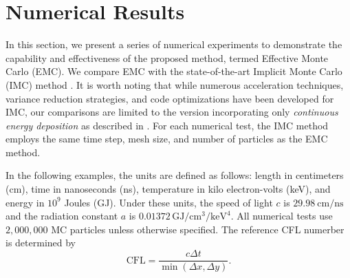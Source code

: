 \documentclass[preprint,12pt]{elsarticle}
\theoremstyle{definition}
\theoremstyle{plain}
\numberwithin{equation}{section}
\numberwithin{algorithm}{section}
\newcounter{eq_count}
\newcounter{subeq_count}
\newcounter{thm_count}
\newcounter{fig_count}
\newcounter{tab_count}
\newcounter{alg_count}
\let\OldSection\section
\renewcommand{\section}{
    \setcounter{eq_count}{0}
    \setcounter{thm_count}{0}
    \setcounter{fig_count}{0}
    \setcounter{tab_count}{0}
    \setcounter{alg_count}{0}
    \OldSection
}
\begin{document}


\section{Numerical Results}
\label{sec:results}
In this section, we present a series of numerical experiments to demonstrate the capability and effectiveness of the proposed method, termed Effective Monte Carlo (EMC). We compare EMC with the state-of-the-art Implicit Monte Carlo (IMC) method \cite{fleck1971implicit}. It is worth noting that while numerous acceleration techniques, variance reduction strategies, and code optimizations have been developed for IMC, our comparisons are limited to the version incorporating only \textit{continuous energy deposition} as described in \cite{fleck1971implicit}. For each numerical test, the IMC method employs the same time step, mesh size, and number of particles as the EMC method.

In the following examples, the units are defined as follows: length in centimeters (cm), time in nanoseconds (ns), temperature in kilo electron-volts (keV), and energy in $10^9$ Joules (GJ). Under these units, the speed of light $c$ is $29.98 \mathrm{~	cm} / \mathrm{ns}$ and the radiation constant $a$ is $0.01372 \, \mathrm{GJ} / \mathrm{cm}^3/ \mathrm{keV}^4$. All numerical tests use $2,000,000$ MC particles unless  otherwise specified. The reference CFL numerber is determined by 
\begin{equation*}
	 \text{CFL}=  \frac{c \Delta t }{\min{(\Delta x,\Delta y)}}.
\end{equation*}
\end{document}
